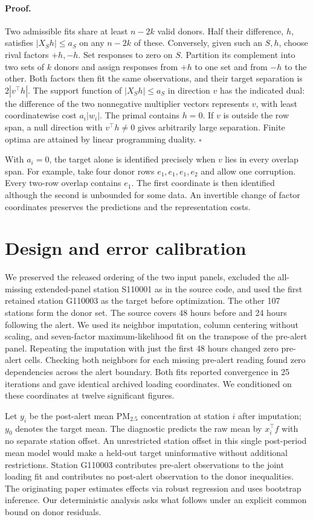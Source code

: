 \documentclass[11pt]{article}
\begin{document}
\paragraph{Proof.} Two admissible fits share at least $n-2k$ valid donors. Half their difference, $h$, satisfies $|X_Sh|\le a_S$ on any $n-2k$ of these. Conversely, given such an $S,h$, choose rival factors $+h,-h$. Set responses to zero on $S$. Partition its complement into two sets of $k$ donors and assign responses from $+h$ to one set and from $-h$ to the other. Both factors then fit the same observations, and their target separation is $2|v^\top h|$. The support function of $|X_Sh|\le a_S$ in direction $v$ has the indicated dual: the difference of the two nonnegative multiplier vectors represents $v$, with least coordinatewise cost $a_i|w_i|$. The primal contains $h=0$. If $v$ is outside the row span, a null direction with $v^\top h\ne0$ gives arbitrarily large separation. Finite optima are attained by linear programming duality. \hfill$\square$

With $a_i=0$, the target alone is identified precisely when $v$ lies in every overlap span. For example, take four donor rows $e_1,e_1,e_1,e_2$ and allow one corruption. Every two-row overlap contains $e_1$. The first coordinate is then identified although the second is unbounded for some data. An invertible change of factor coordinates preserves the predictions and the representation costs.

\section{Design and error calibration}
We preserved the released ordering of the two input panels, excluded the all-missing extended-panel station S110001 as in the source code, and used the first retained station G110003 as the target before optimization. The other 107 stations form the donor set. The source covers 48 hours before and 24 hours following the alert. We used its neighbor imputation, column centering without scaling, and seven-factor maximum-likelihood fit on the transpose of the pre-alert panel. Repeating the imputation with just the first 48 hours changed zero pre-alert cells. Checking both neighbors for each missing pre-alert reading found zero dependencies across the alert boundary. Both fits reported convergence in 25 iterations and gave identical archived loading coordinates. We conditioned on these coordinates at twelve significant figures.

Let $y_i$ be the post-alert mean PM$_{2.5}$ concentration at station $i$ after imputation; $y_0$ denotes the target mean. The diagnostic predicts the raw mean by $x_i^\top f$ with no separate station offset. An unrestricted station offset in this single post-period mean model would make a held-out target uninformative without additional restrictions. Station G110003 contributes pre-alert observations to the joint loading fit and contributes no post-alert observation to the donor inequalities. The originating paper estimates effects via robust regression and uses bootstrap inference. Our deterministic analysis asks what follows under an explicit common bound on donor residuals.
\end{document}
